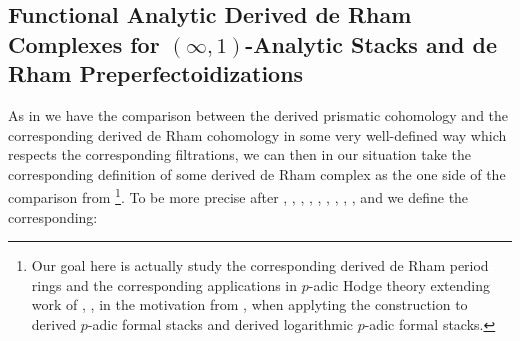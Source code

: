 \documentclass[11pt]{book}
\theoremstyle{definition}
\numberwithin{equation}{section}
\begin{document}
\newpage

\subsection{Functional Analytic Derived de Rham Complexes for $(\infty,1)$-Analytic Stacks and de Rham Preperfectoidizations}



\indent As in \cite{12LL} we have the comparison between the derived prismatic cohomology and the corresponding derived de Rham cohomology in some very well-defined way which respects the corresponding filtrations, we can then in our situation take the corresponding definition of some derived de Rham complex as the one side of the comparison from \cite{12LL}\footnote{Our goal here is actually study the corresponding derived de Rham period rings and the corresponding applications in $p$-adic Hodge theory extending work of \cite{12DLLZ1}, \cite{12DLLZ2}, \cite{12Sch2} in the motivation from \cite{12GL}, when applyting the construction to derived $p$-adic formal stacks and derived logarithmic $p$-adic formal stacks.}. To be more precise after \cite[Chapitre 3]{12An1}, \cite{12An2}, \cite[Chapter 2, Chapter 8]{12B1}, \cite[Chapter 1]{12Bei}, \cite[Chapter 5]{12G1}, \cite[Chapter 3, Chapter 4]{12GL}, \cite[Chapitre II, Chapitre III]{12Ill1}, \cite[Chapitre VIII]{12Ill2}, \cite[Section 4]{12Qui}, and \cite[Example 5.11, Example 5.12]{BMS2} we define the corresponding:
\end{document}
